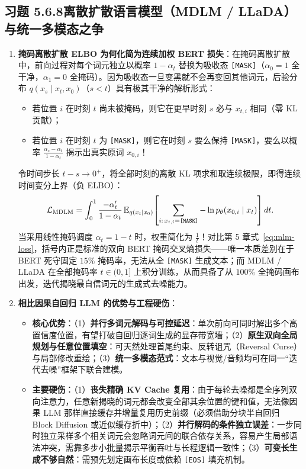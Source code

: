 \subsection*{习题 5.6.8\quad 离散扩散语言模型（MDLM / LLaDA）与统一多模态之争}
\begin{enumerate}[label=(\alph*), leftmargin=1.8em]
  \item \textbf{掩码离散扩散 ELBO 为何化简为连续加权 BERT 损失}：在掩码离散扩散中，前向过程对每个词元独立以概率 $1 - \alpha_t$ 替换为吸收态 \texttt{[MASK]}（$\alpha_0 = 1$ 全干净，$\alpha_1 = 0$ 全掩码）。因为吸收态一旦变黑就不会再变回其他词元，后验分布 $q(x_s \mid x_t, x_0)$（$s < t$）具有极其干净的解析形式：
  \begin{itemize}
    \item 若位置 $i$ 在时刻 $t$ 尚未被掩码，则它在更早时刻 $s$ 必与 $x_{t,i}$ 相同（零 KL 贡献）；
    \item 若位置 $i$ 在时刻 $t$ 为 \texttt{[MASK]}，则它在时刻 $s$ 要么保持 \texttt{[MASK]}，要么以概率 $\frac{\alpha_s - \alpha_t}{1 - \alpha_t}$ 揭示出真实原词 $x_{0,i}$！
  \end{itemize}
  令时间步长 $t - s \to 0^+$，将全部时刻的离散 KL 项求和取连续极限，即得连续时间变分上界（负 ELBO）：
  \[
    \mathcal{L}_{\mathrm{MDLM}}
    = \int_0^1 \frac{-\alpha_t'}{1 - \alpha_t}\,
      \mathbb{E}_{q(x_t \mid x_0)}\!\left[\sum_{i:\, x_{t,i} = \texttt{[MASK]}} -\ln p_\theta(x_{0,i} \mid x_t)\right] dt.
  \]
  当采用线性掩码调度 $\alpha_t = 1 - t$ 时，权重简化为 $\frac{1}{t}$！对比第 5 章式~\eqref{eq:mlm-loss}，括号内正是标准的双向 BERT 掩码交叉熵损失——唯一本质差别在于 BERT 死守固定 $15\%$ 掩码率，无法从全 \texttt{[MASK]} 生成文本；而 MDLM / LLaDA 在全部掩码率 $t \in (0, 1]$ 上积分训练，从而具备了从 $100\%$ 全掩码画布出发，迭代揭晓最自信词元的生成式去噪能力。

  \item \textbf{相比因果自回归 LLM 的优势与工程硬伤}：
  \begin{itemize}
    \item \textbf{核心优势}：（1）\textbf{并行多词元解码与可控延迟}：单次前向可同时解出多个高置信度位置，有望打破自回归逐词生成的显存带宽墙；（2）\textbf{原生双向全局规划与任意位置填空}：可天然处理首尾约束、反转诅咒（Reversal Curse）与局部修改重绘；（3）\textbf{统一多模态范式}：文本与视觉/音频均可在同一“迭代去噪”框架下联合建模。
    \item \textbf{主要硬伤}：（1）\textbf{丧失精确 KV Cache 复用}：由于每轮去噪都是全序列双向注意力，任意新揭晓的词元都会改变全部其余位置的键和值，无法像因果 LLM 那样直接缓存并增量复用历史前缀（必须借助分块半自回归 Block Diffusion 或近似缓存折中）；（2）\textbf{并行解码的条件独立误差}：一步同时独立采样多个相关词元会忽略词元间的联合依存关系，容易产生局部语法冲突，需靠多步小批量揭示平衡吞吐与长程逻辑一致性；（3）\textbf{可变长生成不够自然}：需预先划定画布长度或依赖 \texttt{[EOS]} 填充机制。
  \end{itemize}
\end{enumerate}
